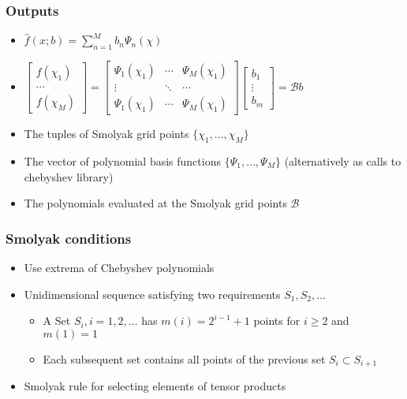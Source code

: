 \documentclass[handout]{beamer}
\begin{document}
\begin{frame}
  \frametitle{Outputs}
  \begin{itemize}
  \item $\hat{f}(x;b)=\sum_{n=1}^M b_n \Psi_n(\chi)$
  \item $
    \begin{bmatrix}
      f(\chi_1)\\ \cdots \\       f(\chi_M)
    \end{bmatrix}=
      \begin{bmatrix}
        \Psi_1(\chi_1) &\cdots &        \Psi_M(\chi_1)\\
\vdots&\ddots&\cdots\\
        \Psi_1(\chi_1)& \cdots   &      \Psi_M(\chi_1)
      \end{bmatrix}
      \begin{bmatrix}
        b_1\\ \vdots \\ b_m
      \end{bmatrix}= \mathcal{B} b
$
  \item The tuples of Smolyak grid points $\{\chi_1, \ldots , \chi_M\}$
  \item The vector of polynomial basis functions $\{\Psi_1, \ldots , \Psi_M\}$ (alternatively as calls to chebyshev library)
  \item The polynomials evaluated at the Smolyak grid points $\mathcal{B}$
  \end{itemize}
\end{frame}


\begin{frame}
  \frametitle{Smolyak conditions}
  \begin{itemize}
  \item Use extrema of Chebyshev polynomials
  \item Unidimensional sequence satisfying two requirements
$S_1, S_2, \ldots$
    \begin{itemize}
    \item A Set $S_i , i=1,2,\ldots$ has $m(i) = 2^{i-1}+1$ points for $i\ge 2 $ and $m(1)=1$
    \item Each subsequent set contains all points of the previous set  $S_i \subset S_{i+1}$
    \end{itemize}
  \item Smolyak rule for selecting elements of tensor products
  \end{itemize}
\end{frame}
\end{document}
